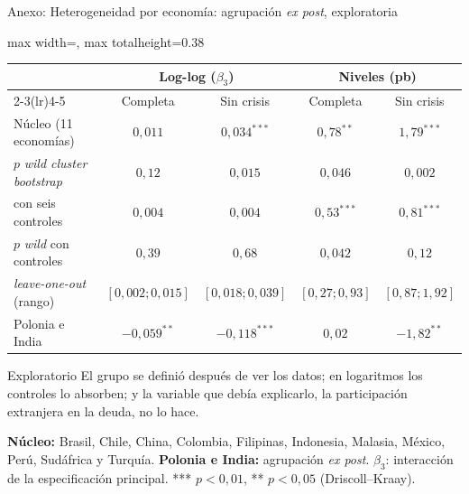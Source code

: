 \documentclass[aspectratio=169]{beamer}
\begin{document}
\begin{frame}{Anexo: Heterogeneidad por economía: agrupación \textit{ex post}, exploratoria}
\centering
\footnotesize
\begin{adjustbox}{max width=\textwidth, max totalheight=0.38\textheight}
\begin{tabular}{l cc cc}
\toprule
 & \multicolumn{2}{c}{Log-log ($\beta_3$)} & \multicolumn{2}{c}{Niveles (pb)} \\
\cmidrule(lr){2-3}\cmidrule(lr){4-5}
 & Completa & Sin crisis & Completa & Sin crisis \\
\midrule
Núcleo (11 economías) & $0{,}011$ & $0{,}034^{***}$ & $0{,}78^{**}$ & $1{,}79^{***}$ \\
\quad $p$ \textit{wild cluster bootstrap} & $0{,}12$ & $0{,}015$ & $0{,}046$ & $0{,}002$ \\
\quad con seis controles & $0{,}004$ & $0{,}004$ & $0{,}53^{***}$ & $0{,}81^{***}$ \\
\quad $p$ \textit{wild} con controles & $0{,}39$ & $0{,}68$ & $0{,}042$ & $0{,}12$ \\
\quad \textit{leave-one-out} (rango) & $[0{,}002;0{,}015]$ & $[0{,}018;0{,}039]$ & $[0{,}27;0{,}93]$ & $[0{,}87;1{,}92]$ \\
\addlinespace
Polonia e India & $-0{,}059^{**}$ & $-0{,}118^{***}$ & $0{,}02$ & $-1{,}82^{**}$ \\
\bottomrule
\end{tabular}
\end{adjustbox}
\vspace{3pt}
\begin{alertblock}{Exploratorio}
\footnotesize El grupo se definió después de ver los datos; en logaritmos los controles lo absorben; y la variable que debía explicarlo, la participación extranjera en la deuda, no lo hace.
\end{alertblock}
\vspace{-2pt}
{\scriptsize\raggedright \textbf{Núcleo:} Brasil, Chile, China, Colombia, Filipinas, Indonesia, Malasia, México, Perú, Sudáfrica y Turquía. \textbf{Polonia e India:} agrupación \textit{ex post}. $\beta_3$: interacción de la especificación principal. *** $p<0{,}01$, ** $p<0{,}05$ (Driscoll--Kraay).\par}
\end{frame}
\end{document}
